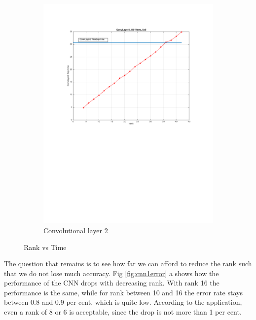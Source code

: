 \documentclass{article} %
\begin{document}
\begin{figure}[h]
\begin{subfigure}[b]{0.40\textwidth}
    \includegraphics[width=\textwidth]{images/imagesCNN_page3.pdf}
    \caption{Convolutional layer 2}
  \end{subfigure}
  \caption{Rank vs Time}
  \label{fig:cnn1time}
\end{figure}

The question that remains is to see how far we can afford to reduce the rank such that we do not lose much accuracy. Fig \ref{fig:cnn1error} a shows how the performance of the CNN drops with decreasing rank. With rank 16 the performance is the same, while for rank between 10 and 16 the error rate stays between 0.8 and 0.9 per cent, which is quite low. According to the application, even a rank of 8 or 6 is acceptable, since the drop is not more than 1 per cent.
\end{document}
